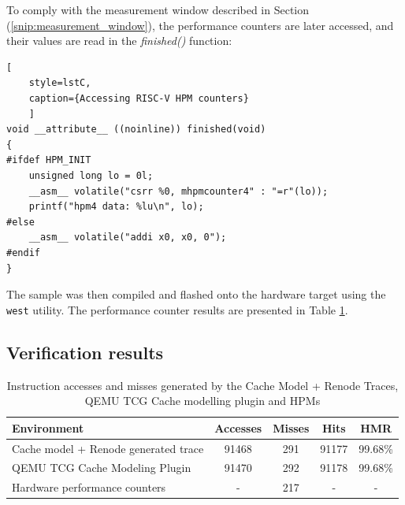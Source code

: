 \noindent To comply with the measurement window described in Section (\ref{snip:measurement_window}), the performance counters are later accessed, and their values are read in the
\textit{finished()} function:

\begin{center}
\centering
\begin{minipage}{\linewidth}
\begin{lstlisting}[
	style=lstC,
    caption={Accessing RISC-V HPM counters}
    ]
void __attribute__ ((noinline)) finished(void)
{
#ifdef HPM_INIT
	unsigned long lo = 0l;
	__asm__ volatile("csrr %0, mhpmcounter4" : "=r"(lo));
	printf("hpm4 data: %lu\n", lo);
#else
	__asm__ volatile("addi x0, x0, 0");
#endif
}
\end{lstlisting}
\end{minipage}
\end{center}

\noindent The sample was then compiled and flashed onto the hardware target using the \texttt{west} utility. The performance counter results are presented in Table \ref{table:cache_results}.

\subsection{Verification results}

\begin{center}
\begin{table}[h!]
\centering
\begin{tabular}{|l|c|c|c|c|}
\hline
\textbf{Environment} & \textbf{Accesses} & \textbf{Misses} & \textbf{Hits} & \textbf{HMR} \\ \hline
Cache model + Renode generated trace    & 91468        & 291         & 91177 & 99.68\%    \\ \hline
QEMU TCG Cache Modeling Plugin          & 91470        & 292         & 91178 & 99.68\%    \\ \hline
Hardware performance counters           & -            & 217         & - & -			  \\ \hline %
\end{tabular}
\caption{Instruction accesses and misses generated by the Cache Model + Renode Traces, QEMU TCG Cache modelling plugin and HPMs}
\label{table:cache_results}
\end{table}
\end{center}

